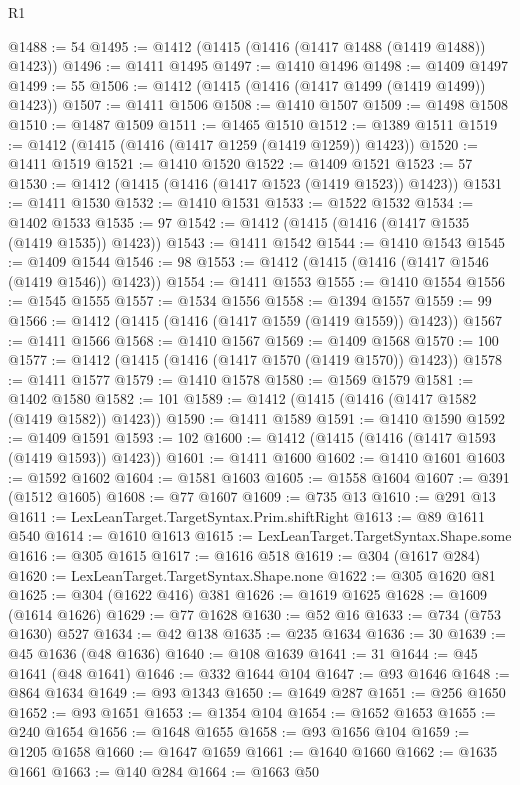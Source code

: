 \begin{lexlean}{R1}
\begin{coremodule}
@1488 := 54
@1495 := @1412 (@1415 (@1416 (@1417 @1488 (@1419 @1488)) @1423))
@1496 := @1411 @1495
@1497 := @1410 @1496
@1498 := @1409 @1497
@1499 := 55
@1506 := @1412 (@1415 (@1416 (@1417 @1499 (@1419 @1499)) @1423))
@1507 := @1411 @1506
@1508 := @1410 @1507
@1509 := @1498 @1508
@1510 := @1487 @1509
@1511 := @1465 @1510
@1512 := @1389 @1511
@1519 := @1412 (@1415 (@1416 (@1417 @1259 (@1419 @1259)) @1423))
@1520 := @1411 @1519
@1521 := @1410 @1520
@1522 := @1409 @1521
@1523 := 57
@1530 := @1412 (@1415 (@1416 (@1417 @1523 (@1419 @1523)) @1423))
@1531 := @1411 @1530
@1532 := @1410 @1531
@1533 := @1522 @1532
@1534 := @1402 @1533
@1535 := 97
@1542 := @1412 (@1415 (@1416 (@1417 @1535 (@1419 @1535)) @1423))
@1543 := @1411 @1542
@1544 := @1410 @1543
@1545 := @1409 @1544
@1546 := 98
@1553 := @1412 (@1415 (@1416 (@1417 @1546 (@1419 @1546)) @1423))
@1554 := @1411 @1553
@1555 := @1410 @1554
@1556 := @1545 @1555
@1557 := @1534 @1556
@1558 := @1394 @1557
@1559 := 99
@1566 := @1412 (@1415 (@1416 (@1417 @1559 (@1419 @1559)) @1423))
@1567 := @1411 @1566
@1568 := @1410 @1567
@1569 := @1409 @1568
@1570 := 100
@1577 := @1412 (@1415 (@1416 (@1417 @1570 (@1419 @1570)) @1423))
@1578 := @1411 @1577
@1579 := @1410 @1578
@1580 := @1569 @1579
@1581 := @1402 @1580
@1582 := 101
@1589 := @1412 (@1415 (@1416 (@1417 @1582 (@1419 @1582)) @1423))
@1590 := @1411 @1589
@1591 := @1410 @1590
@1592 := @1409 @1591
@1593 := 102
@1600 := @1412 (@1415 (@1416 (@1417 @1593 (@1419 @1593)) @1423))
@1601 := @1411 @1600
@1602 := @1410 @1601
@1603 := @1592 @1602
@1604 := @1581 @1603
@1605 := @1558 @1604
@1607 := @391 (@1512 @1605)
@1608 := @77 @1607
@1609 := @735 @13
@1610 := @291 @13
@1611 := LexLeanTarget.TargetSyntax.Prim.shiftRight
@1613 := @89 @1611 @540
@1614 := @1610 @1613
@1615 := LexLeanTarget.TargetSyntax.Shape.some
@1616 := @305 @1615
@1617 := @1616 @518
@1619 := @304 (@1617 @284)
@1620 := LexLeanTarget.TargetSyntax.Shape.none
@1622 := @305 @1620 @81
@1625 := @304 (@1622 @416) @381
@1626 := @1619 @1625
@1628 := @1609 (@1614 @1626)
@1629 := @77 @1628
@1630 := @52 @16
@1633 := @734 (@753 @1630) @527
@1634 := @42 @138
@1635 := @235 @1634
@1636 := 30
@1639 := @45 @1636 (@48 @1636)
@1640 := @108 @1639
@1641 := 31
@1644 := @45 @1641 (@48 @1641)
@1646 := @332 @1644 @104
@1647 := @93 @1646
@1648 := @864 @1634
@1649 := @93 @1343
@1650 := @1649 @287
@1651 := @256 @1650
@1652 := @93 @1651
@1653 := @1354 @104
@1654 := @1652 @1653
@1655 := @240 @1654
@1656 := @1648 @1655
@1658 := @93 @1656 @104
@1659 := @1205 @1658
@1660 := @1647 @1659
@1661 := @1640 @1660
@1662 := @1635 @1661
@1663 := @140 @284
@1664 := @1663 @50

\end{coremodule}
\end{lexlean}
